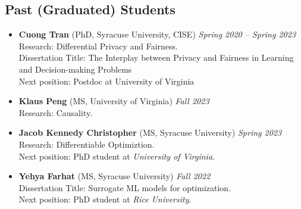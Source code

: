 \subsection*{Past (Graduated) Students}
\begin{itemize}
  \item \textbf{Cuong Tran} ({\sc PhD, Syracuse University}, CISE) 
  \hfill{\em Spring 2020 -- Spring 2023}\\
  {\sc Research}: Differential Privacy and Fairness.\\
  {\sc Dissertation Title:} The Interplay between Privacy and Fairness in
  Learning and Decision-making Problems\\
  {\sc Next position:} Postdoc at University of Virginia 

  \item \textbf{Klaus Peng} ({\sc MS, University of Virginia}) \hfill{\em Fall 2023}\\
  {\sc Research:} Causality.

  \item \textbf{Jacob Kennedy Christopher} ({\sc MS, Syracuse University}) \hfill{\em Spring 2023}\\
  {\sc Research:} Differentiable Optimiztion.\\
  {\sc Next position:} PhD student at \textit{University of Virginia}.

  \item \textbf{Yehya Farhat} ({\sc MS, Syracuse University}) \hfill{\em Fall 2022}\\
  {\sc Dissertation Title:} Surrogate ML models for optimization.\\
  {\sc Next position:} PhD student at \textit{Rice University}.
\end{itemize}


